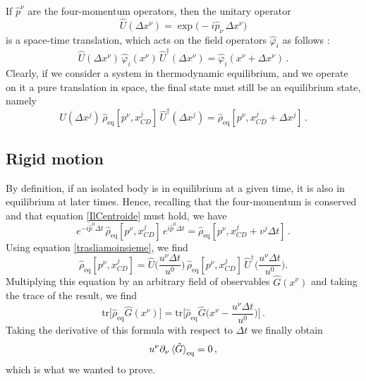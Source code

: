\documentclass[twocolumn,usenatbib]{mnras2}
\begin{document}
If $\hat{p}^\nu$ are the four-momentum operators, then the unitary operator
\begin{equation}
    \hat{U}(\Delta x^\nu) = \exp{\big(-i\hat{p}_\nu \, \Delta x^\nu \big)}
\end{equation}
is a space-time translation, which acts on the field operators $\hat{\varphi}_i$ as follows \citep{Weinberg_QFT_1995}:
\begin{equation}
 \hat{U}(\Delta x^\nu) \, \hat{\varphi}_i (x^\nu) \, \hat{U}^\dagger(\Delta x^\nu) = \hat{\varphi}_i (x^\nu +\Delta x^\nu) \, .
\end{equation}
Clearly, if we consider a system in thermodynamic equilibrium, and we operate on it a pure translation in space, the final state must still be an equilibrium state, namely
\begin{equation}\label{trasliamoinsieme}
  \hat{U}(\Delta x^j) \, \hat{\rho}_{\text{eq}}[p^\nu , x_{CD}^j] \, \hat{U}^\dagger(\Delta x^j) = \hat{\rho}_{\text{eq}}[p^\nu , x_{CD}^j+\Delta x^j] \, .
\end{equation}

\subsection{Rigid motion}

By definition, if an isolated body is in equilibrium at a given time, it is also in equilibrium at later times. Hence, recalling that the four-momentum is conserved and that equation \eqref{IlCentroide} must hold, we have
\begin{equation}
    e^{-i \hat{p}^0 \Delta t} \, \hat{\rho}_{\text{eq}}[p^\nu , x_{CD}^j] \,  e^{i \hat{p}^0 \Delta t} = \hat{\rho}_{\text{eq}}[p^\nu , x_{CD}^j+v^j \Delta t] \, . 
\end{equation}
Using equation \eqref{trasliamoinsieme}, we find
\begin{equation}\label{mountains}
    \hat{\rho}_{\text{eq}}[p^\nu , x_{CD}^j] = \hat{U} \bigg( \dfrac{u^\nu \Delta t}{u^0} \bigg) \, \hat{\rho}_{\text{eq}}[p^\nu , x_{CD}^j] \,  \hat{U}^\dagger\bigg( \dfrac{u^\nu \Delta t}{u^0} \bigg) . 
\end{equation}
Multiplying this equation by an arbitrary field of observables $\hat{G}(x^\nu)$ and taking the trace of the result, we find
\begin{equation}
    \text{tr} \bigg[ \hat{\rho}_{\text{eq}} \hat{G}(x^\nu) \bigg] = \text{tr} \bigg[ \hat{\rho}_{\text{eq}} \hat{G}\bigg(x^\nu - \dfrac{u^\nu \Delta t}{u^0} \bigg) \bigg] \, .
\end{equation}
Taking the derivative of this formula with respect to $\Delta t$ we finally obtain
\begin{equation}\label{Laprovaprovata}
    u^\nu \partial_\nu \braket{\hat{G}}_{\text{eq}}=0 \, ,
\end{equation}
which is what we wanted to prove.
\end{document}
